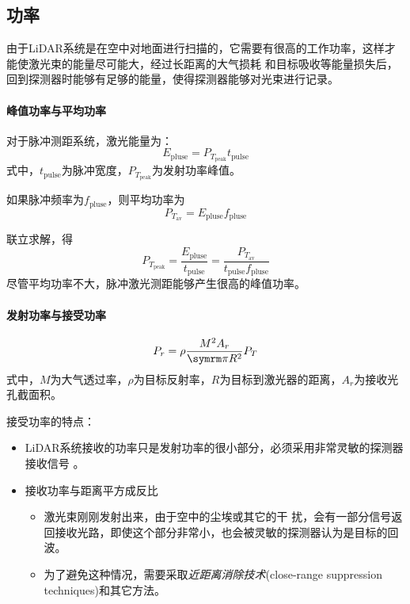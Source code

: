 \subsection{功率} %
由于LiDAR系统是在空中对地面进行扫描的，它需要有很高的工作功率，这样才能使激光束的能量尽可能大，经过长距离的大气损耗 和目标吸收等能量损失后，回到探测器时能够有足够的能量，使得探测器能够对光束进行记录。

\paragraph{峰值功率与平均功率}
对于脉冲测距系统，激光能量为：
\begin{equation}
E_{\text{pluse}} = P_{T_{\text{peak}}} t_{\text{pulse}}
\end{equation}
式中，$ t_{\text{pulse}} $为脉冲宽度，$ P_{T_{\text{peak}}} $为发射功率峰值。
	
如果脉冲频率为$ f_{\text{pluse}} $，则平均功率为
\begin{equation}
P_{T_{\text{av}}} = E_{\text{pluse}}f_{\text{pluse}}
\end{equation}

联立求解，得
\begin{equation}
P_{T_{\text{peak}}} = \dfrac{E_{\text{pluse}}}{t_{\text{pulse}}} = \dfrac{P_{T_{\text{av}}}}{t_{\text{pulse}}f_{\text{pluse}}}
\end{equation}
尽管平均功率不大，脉冲激光测距能够产生很高的峰值功率。

\paragraph{发射功率与接受功率}
\begin{equation}
P_r = \rho \dfrac{M^2 A_r}{\cpi R^2} P_T
\end{equation}
式中，$ M $为大气透过率，$ \rho $为目标反射率，$ R $为目标到激光器的距离，$ A_r $为接收光孔截面积。

接受功率的特点：
\begin{itemize}
	\item LiDAR系统接收的功率只是发射功率的很小部分，必须采用非常灵敏的探测器接收信号 。
	\item 接收功率与距离平方成反比
		\begin{itemize}
			\item 激光束刚刚发射出来，由于空中的尘埃或其它的干 扰，会有一部分信号返回接收光路，即使这个部分非常小，也会被灵敏的探测器认为是目标的回波。
			\item 为了避免这种情况，需要采取\textit{近距离消除技术}(close-range suppression techniques)和其它方法。
		\end{itemize}
\end{itemize}

